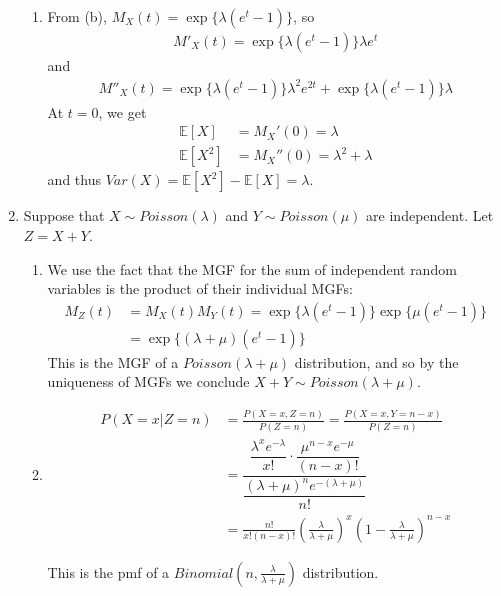 \documentclass[12pt]{article}
\begin{document}
\begin{enumerate}
\begin{enumerate}
\item From (b), $M_X(t) = \exp\{\lambda (e^t - 1)\}$, so
\begin{align*}
M'_X(t) = \exp\{\lambda (e^t - 1)\} \lambda e^t
\end{align*}
and
\begin{align*}
M''_X(t) = \exp\{\lambda (e^t - 1)\} \lambda^2 e^{2t} + \exp\{\lambda (e^t - 1)\} \lambda
\end{align*}
At $t = 0$, we get
\begin{align*}
\mathbb{E}[X] &= M_X'(0) = \lambda \\
\mathbb{E}[X^2] &= M_X''(0) = \lambda^2 + \lambda
\end{align*}
and thus $Var(X) = \mathbb{E}[X^2] - \mathbb{E}[X] = \lambda$.

\end{enumerate}

\item Suppose that $X \sim Poisson(\lambda)$ and $Y \sim Poisson(\mu)$ are independent. Let $Z = X + Y$.

\begin{enumerate}
\item We use the fact that the MGF for the sum of independent random variables is the product of their individual MGFs:
\begin{align*}
M_Z(t) &= M_X(t)M_Y(t) = \exp\{\lambda (e^t - 1)\}\exp\{\mu (e^t - 1)\} \\
&= \exp\{(\lambda + \mu) (e^t - 1)\}
\end{align*}
This is the MGF of a $Poisson(\lambda + \mu)$ distribution, and so by the uniqueness of MGFs we conclude $X + Y \sim Poisson(\lambda + \mu)$.

\item 

\begin{align*}
P(X = x | Z = n) &= \frac{P(X = x, Z = n)}{P(Z = n)} = \frac{P(X = x, Y = n - x)}{P(Z = n)} \\
&= \dfrac{\dfrac{\lambda^x e^{-\lambda}}{x!} \cdot \dfrac{\mu^{n-x} e^{-\mu}}{(n-x)!}}{\dfrac{(\lambda + \mu)^n e^{-(\lambda + \mu)}}{n!}} \\
&= \frac{n!}{x!(n - x)!} \left( \frac{\lambda}{\lambda + \mu} \right)^x \left( 1 - \frac{\lambda}{\lambda + \mu} \right)^{n-x}
\end{align*}

This is the pmf of a $Binomial\left(n, \frac{\lambda}{\lambda + \mu} \right)$ distribution.

\end{enumerate}



\end{enumerate}
\end{document}

